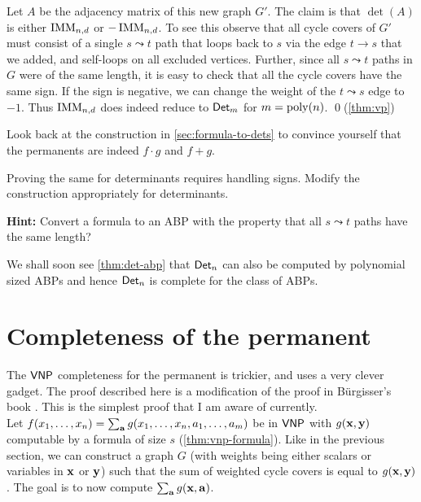 Let $A$ be the adjacency matrix of this new graph $G'$. 
The claim is that $\det(A)$ is either $\operatorname{\mathrm{IMM}}_{n,d}$ or $-\operatorname{\mathrm{IMM}}_{n,d}$. 
To see this observe that all cycle covers of $G'$ must consist of a single $s\leadsto t$ path that loops back to $s$ via the edge $t\rightarrow s$ that we added, and self-loops on all excluded vertices. 
Further, since all $s\leadsto t$ paths in $G$ were of the same length, it is easy to check that all the cycle covers
have the same sign. If the sign is negative, we can change the weight of the $t\leadsto s$ edge to $-1$.
Thus $\operatorname{\mathrm{IMM}}_{n,d}$ does indeed reduce to $\operatorname{\mathsf{Det}}_m$ for $m = \operatorname{poly}(n)$. \qed {\footnotesize (\autoref{thm:vp})}\\

\begin{exercise}
Look back at the construction in \autoref{sec:formula-to-dets} to convince yourself that the permanents are indeed $f \cdot g$ and $f + g$. 

Proving the same for determinants requires handling signs. Modify the construction appropriately for determinants. 

{\bf Hint:} Convert a formula to an ABP with the property that all $s \leadsto t$ paths have the same length?
\end{exercise}

We shall soon see \cref{thm:det-abp} that $\operatorname{\mathsf{Det}}_n$ can also be computed by polynomial sized ABPs and hence $\operatorname{\mathsf{Det}}_n$ is complete for the class of ABPs. 

\section{Completeness of the permanent}

The $\mathsf{VNP}$ completeness for the permanent is trickier, and uses a very clever gadget. 
The proof described here is a modification of the proof in B\"urgisser's book \cite{bur00}. 
This is the simplest proof that I am aware of currently. \\

Let $f(x_1,\dots, x_n) = \sum_{\mathbf{a}} g(x_1,\dots, x_n, a_1,\dots, a_m)$ be in $\mathsf{VNP}$ with $g(\mathbf{x}, \mathbf{y})$ computable by a formula of size $s$ (\autoref{thm:vnp-formula}). 
Like in the previous section, we can construct a graph $G$ (with weights being either scalars or variables in $\mathbf{x}$ or $\mathbf{y}$) such that the sum of weighted cycle covers is equal to $g(\mathbf{x}, \mathbf{y})$. 
The goal is to now compute $\sum_{\mathbf{a}} g(\mathbf{x}, \mathbf{a})$. \\

